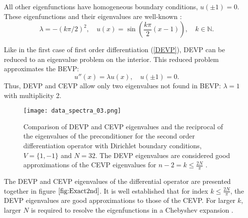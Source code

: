 \documentclass{sfuthesis}
\begin{document}
All other eigenfunctions have homogeneous boundary conditions, $u(\pm1) = 0$.
These eigenfunctions and their eigenvalues are well-known \cite{JB, GottliebLustman, WeidemanTrefethen} :
\begin{equation}
\lambda = -(k \pi / 2)^2, \quad u(x) = \sin \left ( \frac{k \pi}{2} (x -1 ) \right ), \quad k \in \mathbb{N}.
\end{equation}

Like in the first case of first order differentiation (\ref{DEVP}), DEVP can be reduced to an eigenvalue problem on the interior.
This reduced problem approximates the BEVP:
\begin{equation}
u''(x) = \lambda u(x), \quad u(\pm1) = 0.
\end{equation}
Thus, DEVP and CEVP allow only two eigenvalues not found in BEVP: $\lambda = 1$ with multiplicity 2.

\begin{figure}
\texttt{[image: data\_spectra\_03.png]}
\caption{Comparison of DEVP and CEVP eigenvalues and the reciprocal of the eigenvalues of the preconditioner for the second order differentiation operator with Dirichlet boundary conditions, $V = \{1, -1\}$ and $N=32$.
The DEVP eigenvalues are considered good approximations of the CEVP eigenvalues for $n-2 = k \leq \frac{2 N}{\pi}$ \cite{WeidemanTrefethen, GottliebOrszag}.}
\label{fig:Exact2nd}
\end{figure}

The DEVP and CEVP eigenvalues of the differential operator are presented together in figure $\ref{fig:Exact2nd}$.
It is well established \cite{WeidemanTrefethen, GottliebOrszag} that for index $k \leq \frac{2 N}{\pi}$, the DEVP eigenvalues are good approximations to those of the CEVP.
For larger $k$, larger $N$ is required to resolve the eigenfunctions in a Chebyshev expansion \cite{GottliebOrszag}.
\end{document}
